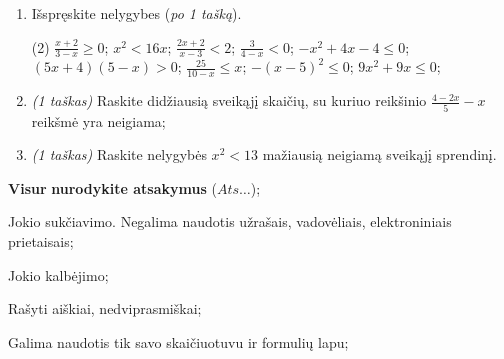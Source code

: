 \documentclass[a4paper]{article}
\begin{document}
\begin{enumerate}
      \item Išspręskite nelygybes (\textit{po 1 tašką}).

            \begin{tasks}[item-format={\normalfont}, after-item-skip=2mm](2)
                  \task $\frac{x+2}{3-x} \geqslant 0$;
                  \task $x^2<16x$;
                  \task $\frac{2x+2}{x-3}<2$;
                  \task $\frac{3}{4-x}<0$;
                  \task $-x^2+4x-4 \leqslant 0$;
                  \task $(5x+4)(5-x)>0$;
                  \task $\frac{25}{10-x} \leqslant x$;
                  \task $-(x-5)^2 \leqslant 0$;
                  \task $9x^2+9x \leq 0$;
            \end{tasks}

      \item \textit{(1 taškas)} Raskite didžiausią sveikąjį skaičių, su kuriuo reikšinio $\frac{4-2x}{5}-x$ reikšmė yra neigiama;
      \item \textit{(1 taškas)} Raskite nelygybės $x^2<13$ mažiausią neigiamą sveikąjį sprendinį.
\end{enumerate}

\begin{small}
      \begin{enumerate*}[label={(\arabic*)}]
            \item \textbf{Visur} \textbf{nurodykite atsakymus} ($Ats\ldots$);
            \item Jokio sukčiavimo. Negalima naudotis užrašais, vadovėliais,
            elektroniniais prietaisais;
            \item Jokio kalbėjimo;
            \item Rašyti aiškiai, nedviprasmiškai;
            \item Galima naudotis tik savo skaičiuotuvu ir formulių lapu;
      \end{enumerate*}
\end{small}
\end{document}

